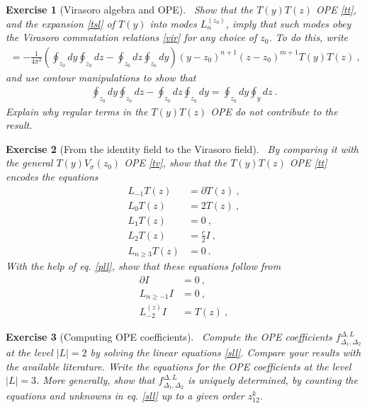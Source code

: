 \documentclass[12pt,a4paper,notitlepage]{report}
\numberwithin{equation}{section}
\theoremstyle{break}
\newtheorem{exo}{Exercise}[chapter]
\begin{document}
\begin{exo}[Virasoro algebra and OPE] 
~\label{exott}
Show that the $T(y)T(z)$ OPE \eqref{tt}, and the expansion \eqref{tsl} of $T(y)$ into modes $L_n^{(z_0)}$, imply that such modes obey the Virasoro commutation relations \eqref{vir} for any choice of $z_0$.
To do this, write 
\begin{align}
 [L_n^{(z_0)},L_m^{(z_0)}] = -\frac{1}{4\pi^2} \left(\oint_{z_0} dy \oint_{z_0} dz - \oint_{z_0} dz \oint_{z_0} dy\right) (y-z_0)^{n+1}(z-z_0)^{m+1} T(y)T(z)\ ,
\end{align}
and use contour manipulations to show that 
\begin{align}
 \oint_{z_0} dy \oint_{z_0} dz - \oint_{z_0} dz \oint_{z_0} dy = \oint_{z_0} dy \oint_y dz\ .
\end{align}
Explain why regular terms in the $T(y)T(z)$ OPE do not contribute to the result.
\end{exo}

\begin{exo}[From the identity field to the Virasoro field]
 ~\label{exoit}
By comparing it with the general $T(y)V_\sigma(z_0)$ OPE \eqref{tv}, show that the $T(y)T(z)$ OPE \eqref{tt} encodes the equations
\begin{align}
 L_{-1}T(z) &= \partial T(z) \ ,
\label{lmt}
\\
L_0 T(z) &= 2 T(z)\ ,
\\
L_1 T(z) &= 0 \ ,
\\
L_2 T(z) &= \frac{c}{2} I\ ,
\\
L_{n\geq 3} T(z) &= 0 \ .
\label{lgt}
\end{align}
With the help of eq. \eqref{pll}, show that these equations follow from 
\begin{align}
 \partial I & = 0\ ,
\label{piz}
\\
 L_{n\geq -1} I& = 0\ ,
\\
L_{-2}^{(z)}I & = T(z)\ ,
\label{let}
\end{align}
\end{exo}

\begin{exo}[Computing OPE coefficients]
 ~\label{exohf}
Compute the OPE coefficients $f^{\Delta,L}_{\Delta_1,\Delta_2}$ at the level $|L|= 2$ by solving the linear equations \eqref{sll}.
Compare your results with the available literature.
Write the equations for the OPE coefficients at the level $|L|=3$. 
More generally, show that $f^{\Delta,L}_{\Delta_1,\Delta_2}$ is uniquely determined, 
by counting the equations and unknowns in eq. \eqref{sll} up to a given order $z_{12}^k$.
\end{exo}
\end{document}
